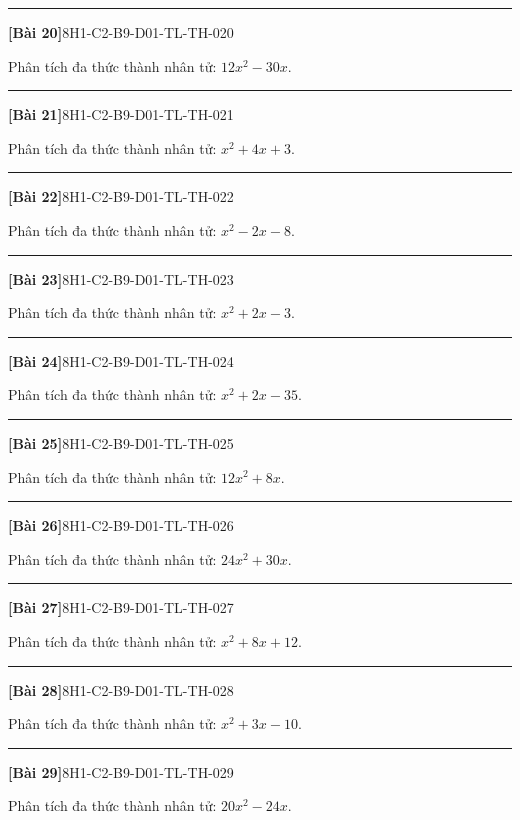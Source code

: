 \documentclass[12pt,a4paper]{article}
\newif\ifloigiai
\newenvironment{cauhoi}[2]{%
  \par\medskip\noindent\rule{\textwidth}{0.4pt}\par\nopagebreak
  \noindent\textbf{[#1]}\hfill{\scriptsize\ttfamily #2}\par\nopagebreak\smallskip}{\par}
\newcommand{\loigiai}[1]{\ifloigiai\par\smallskip\noindent\textit{Lời giải.} #1\par\fi}
\begin{document}
\begin{cauhoi}{Bài 20}{8H1-C2-B9-D01-TL-TH-020}
Phân tích đa thức thành nhân tử: $12x^{2} - 30x$.
\loigiai{Nhân tử chung của các hạng tử là $6x$. Vậy $12x^{2} - 30x=6x(2x - 5)$.}
\end{cauhoi}
\begin{cauhoi}{Bài 21}{8H1-C2-B9-D01-TL-TH-021}
Phân tích đa thức thành nhân tử: $x^{2} + 4x + 3$.
\loigiai{Nhóm hạng tử: $x^{2} + 4x + 3=(x^{2} + 3x)+(x + 3)=x(x + 3)+(x + 3)=(x + 3)(x + 1)$.}
\end{cauhoi}
\begin{cauhoi}{Bài 22}{8H1-C2-B9-D01-TL-TH-022}
Phân tích đa thức thành nhân tử: $x^{2} - 2x - 8$.
\loigiai{Nhóm hạng tử: $x^{2} - 2x - 8=(x^{2} + 2x)+(-4x - 8)=x(x + 2)-4(x + 2)=(x + 2)(x - 4)$.}
\end{cauhoi}
\begin{cauhoi}{Bài 23}{8H1-C2-B9-D01-TL-TH-023}
Phân tích đa thức thành nhân tử: $x^{2} + 2x - 3$.
\loigiai{Nhóm hạng tử: $x^{2} + 2x - 3=(x^{2} + 3x)+(-x - 3)=x(x + 3)-(x + 3)=(x + 3)(x - 1)$.}
\end{cauhoi}
\begin{cauhoi}{Bài 24}{8H1-C2-B9-D01-TL-TH-024}
Phân tích đa thức thành nhân tử: $x^{2} + 2x - 35$.
\loigiai{Nhóm hạng tử: $x^{2} + 2x - 35=(x^{2} + 7x)+(-5x - 35)=x(x + 7)-5(x + 7)=(x + 7)(x - 5)$.}
\end{cauhoi}
\begin{cauhoi}{Bài 25}{8H1-C2-B9-D01-TL-TH-025}
Phân tích đa thức thành nhân tử: $12x^{2} + 8x$.
\loigiai{Nhân tử chung của các hạng tử là $4x$. Vậy $12x^{2} + 8x=4x(3x + 2)$.}
\end{cauhoi}
\begin{cauhoi}{Bài 26}{8H1-C2-B9-D01-TL-TH-026}
Phân tích đa thức thành nhân tử: $24x^{2} + 30x$.
\loigiai{Nhân tử chung của các hạng tử là $6x$. Vậy $24x^{2} + 30x=6x(4x + 5)$.}
\end{cauhoi}
\begin{cauhoi}{Bài 27}{8H1-C2-B9-D01-TL-TH-027}
Phân tích đa thức thành nhân tử: $x^{2} + 8x + 12$.
\loigiai{Nhóm hạng tử: $x^{2} + 8x + 12=(x^{2} + 6x)+(2x + 12)=x(x + 6)+2(x + 6)=(x + 6)(x + 2)$.}
\end{cauhoi}
\begin{cauhoi}{Bài 28}{8H1-C2-B9-D01-TL-TH-028}
Phân tích đa thức thành nhân tử: $x^{2} + 3x - 10$.
\loigiai{Nhóm hạng tử: $x^{2} + 3x - 10=(x^{2} + 5x)+(-2x - 10)=x(x + 5)-2(x + 5)=(x + 5)(x - 2)$.}
\end{cauhoi}
\begin{cauhoi}{Bài 29}{8H1-C2-B9-D01-TL-TH-029}
Phân tích đa thức thành nhân tử: $20x^{2} - 24x$.
\loigiai{Nhân tử chung của các hạng tử là $4x$. Vậy $20x^{2} - 24x=4x(5x - 6)$.}
\end{cauhoi}
\end{document}
